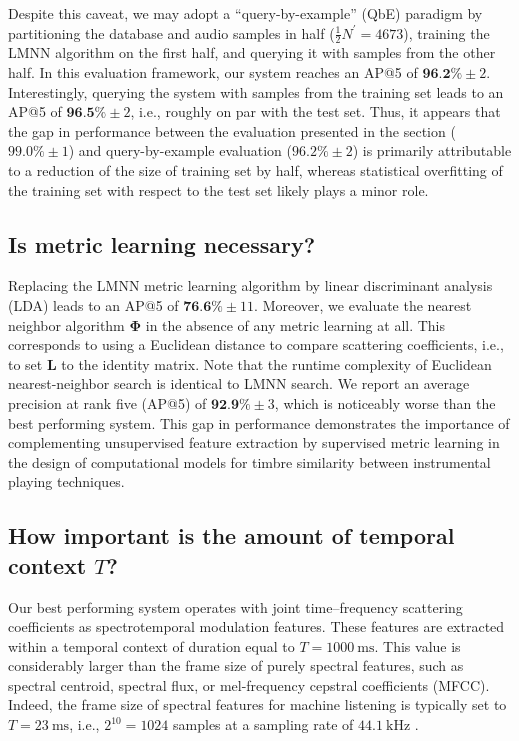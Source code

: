 \documentclass{bmcart}
\newcommand{\ja}[1]{\textcolor{purple}{JA: #1}\xspace}
\newcommand{\lnameref}[1]{%
\bgroup
\let\nmu\MakeLowercase
\nameref{#1}\egroup}
\newcommand{\nmu}{}
\begin{document}
Despite this caveat, we may adopt a ``query-by-example'' (QbE) paradigm by  partitioning the database and audio samples in half ($\frac{1}{2}N^{\prime}=4673$), training the LMNN algorithm on the first half, and querying it with samples from the other half.
In this evaluation framework, our system reaches an AP@5 of $\textbf{96.2\%} \pm 2$.
Interestingly, querying the system with samples from the training set leads to an AP@5 of $\textbf{96.5\%} \pm 2$, i.e., roughly on par with the test set.
Thus, it appears that the gap in performance between the evaluation presented in the \lnameref{sec:results} section ($99.0\%\pm 1$) and query-by-example evaluation ($96.2\% \pm 2$) is primarily attributable to a reduction of the size of training set by half, whereas statistical overfitting of the training set with respect to the test set likely plays a minor role.


\subsection*{Is metric learning necessary?}
Replacing the LMNN metric learning algorithm by linear discriminant analysis (LDA) leads to an AP@5 of $\textbf{76.6}\% \pm 11$.
Moreover, we evaluate the nearest neighbor algorithm $\mathbf{\Phi}$ in the absence of any metric learning at all. %
This corresponds to using a Euclidean distance to compare scattering coefficients, i.e., to set $\mathbf{L}$ to the identity matrix.
Note that the runtime complexity of Euclidean nearest-neighbor search is identical to LMNN search. %
We report an average precision at rank five (AP@5) of $\textbf{92.9\%} \pm 3$, which is noticeably worse than the best performing system.
This gap in performance demonstrates the importance of complementing unsupervised feature extraction by supervised metric learning in the design  of computational models for timbre similarity between instrumental playing techniques.

\subsection*{How important is the amount of temporal context $T$?}

Our best performing system operates with joint time--frequency scattering coefficients as spectrotemporal modulation features.
These features are extracted within a temporal context of duration equal to $T=\SI{1000}{\milli\second}$.
This value is considerably larger than the frame size of purely spectral features, such as spectral centroid, spectral flux, or mel-frequency cepstral coefficients (MFCC).
Indeed, the frame size of spectral features for machine listening is typically set to $T=\SI{23}{\milli\second}$, i.e., $2^{10}=1024$ samples at a sampling rate of $\SI{44,1}{\kilo\hertz}$ \cite{brown1999jasa,eronen2000icassp}.
\end{document}
